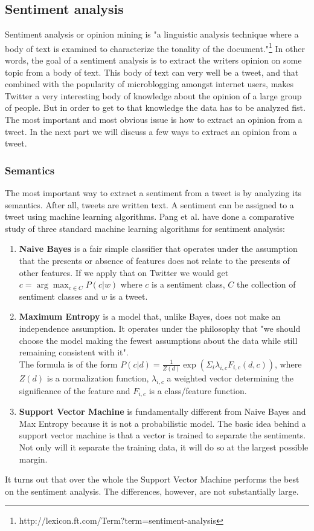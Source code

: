 \documentclass{article}
\begin{document}
\subsection{Sentiment analysis}
Sentiment analysis or opinion mining is "a linguistic analysis technique where a body of text is examined to characterize the tonality of the document."\footnote{http://lexicon.ft.com/Term?term=sentiment-analysis} In other words, the goal of a sentiment analysis is to extract the writers opinion on some topic from a body of text. This body of text can very well be a tweet, and that combined with the popularity of microblogging amongst internet users, makes Twitter a very interesting body of knowledge about the opinion of a large group of people. But in order to get to that knowledge the data has to be analyzed fist. 
The most important and most obvious issue is how to extract an opinion from a tweet. In the next part we will discuss a few ways to extract an opinion from a tweet.
\subsubsection{Semantics }
The most important way to extract a sentiment from a tweet is by analyzing its semantics. After all, tweets are written text. A sentiment can be assigned to a tweet using machine learning algorithms. Pang et al. \cite{machineLearning} have done a comparative study of three standard machine learning algorithms for sentiment analysis: 
\begin{enumerate}
\item \textbf{Naive Bayes} is a fair simple classifier that operates under the assumption that the presents or absence of features does not relate to the presents of other features. If we apply that on Twitter we would get $c = \arg\max_{c\in C} P(c|w)$ where $c$ is a sentiment class, $C$ the collection of sentiment classes and $w$ is a tweet. \cite{sentAnalysis}
\item \textbf{Maximum Entropy} is a model that, unlike Bayes, does not make an independence assumption. It operates under the philosophy that "we should choose the model making the fewest assumptions about the data while still remaining consistent with it".\cite{machineLearning} \\
The formula is of the form $P(c|d) = \frac{1}{Z(d)}\exp(\Sigma_i \lambda_{i,c}F_{i,c}(d,c))$, where $Z(d)$ is a normalization function, $\lambda_{i,c}$ a weighted vector determining the significance of the feature and $F_{i,c}$ is a class/feature function. 
\item \textbf{Support Vector Machine} is fundamentally different from Naive Bayes and Max Entropy because it is not a probabilistic model. The basic idea behind a support vector machine is that a vector is trained to separate the sentiments. Not only will it separate the training data, it will do so at the largest possible margin. 
\end{enumerate}
It turns out that over the whole the Support Vector Machine performs the best on the sentiment analysis\cite{machineLearning}. The differences, however, are not substantially large. 
\end{document}
